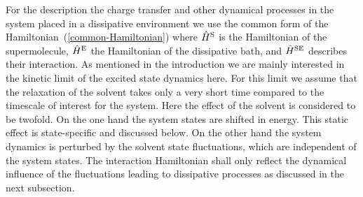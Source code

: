 \documentclass[12pt,twoside,a4paper]{report}
\begin{document}
For the description the charge transfer 
and other dynamical processes in 
the system placed in a dissipative environment 
we use the common form of the 
Hamiltonian~(\ref{common-Hamiltonian})
where 
$\hat H^{\rm S}$ is the Hamiltonian of the supermolecule, 
$\hat H^{\rm E}$ the Hamiltonian of the dissipative bath, and 
$\hat H^{\rm SE}$ describes their interaction. 
As mentioned in the introduction we are mainly interested in the kinetic
limit of the excited state dynamics here.  For this limit we assume
that the relaxation of the solvent takes only a very short time
compared to the timescale of interest for the system.  
Here the effect of the solvent is considered to be twofold.
On the one hand the system states are shifted in energy. 
This static effect is state-specific and discussed below.  
On the other hand the system dynamics is perturbed by the solvent state fluctuations,
which are independent of the system states.
The interaction Hamiltonian shall only reflect the dynamical influence of
the fluctuations 
leading to dissipative processes as discussed in the next subsection.  
\end{document}
